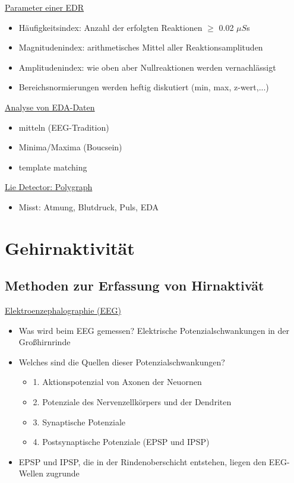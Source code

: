 \documentclass[a4paper,10pt,oneside]{article}
\begin{document}
\underline{Parameter einer EDR} \\
	\begin{itemize}
		\item Häufigkeitsindex: Anzahl der erfolgten Reaktionen $\geq$ 0.02 $\mu S$s
		\item Magnitudenindex: arithmetisches Mittel aller Reaktionsamplituden
		\item Amplitudenindex: wie oben aber Nullreaktionen werden vernachlässigt
		\item Bereichsnormierungen werden heftig diskutiert (min, max, z-wert,...)
	\end{itemize}
	
\underline{Analyse von EDA-Daten} \\
	\begin{itemize}
		\item mitteln (EEG-Tradition)
		\item Minima/Maxima (Boucsein)
		\item template matching
	\end{itemize}

\underline{Lie Detector: Polygraph} \\
	\begin{itemize}
		\item Misst: Atmung, Blutdruck, Puls, EDA
	\end{itemize}
	
\section{Gehirnaktivität}
\subsection{Methoden zur Erfassung von Hirnaktivät}

\underline{Elektroenzephalographie (EEG)} \\
	\begin{itemize}
		\item Was wird beim EEG gemessen? Elektrische Potenzialschwankungen in der Großhirnrinde
		\item Welches sind die Quellen dieser Potenzialschwankungen?
			\begin{itemize}
				\item 1. Aktionspotenzial von Axonen der Neuornen
				\item 2. Potenziale des Nervenzellkörpers und der Dendriten
				\item 3. Synaptische Potenziale 
				\item 4. Postsynaptische Potenziale (EPSP und IPSP)
			\end{itemize}
		\item EPSP und IPSP, die in der Rindenoberschicht entstehen, liegen den EEG-Wellen zugrunde
	\end{itemize}
	
\end{document}

